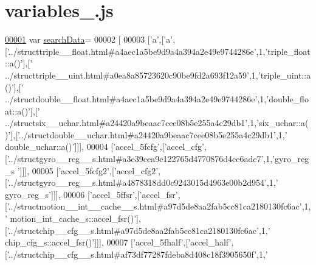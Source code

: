 \hypertarget{variables__1_8js_source}{}\section{variables\+\_.\+js}
\label{variables__1_8js_source}

\begin{DoxyCode}
\hypertarget{variables__1_8js_source.tex_l00001}{}\hyperlink{variables__1_8js_ad01a7523f103d6242ef9b0451861231e}{00001} var \hyperlink{variables__1_8js_ad01a7523f103d6242ef9b0451861231e}{searchData}=
00002 [
00003   [\textcolor{charliteral}{'a'},[\textcolor{charliteral}{'a'},[\textcolor{stringliteral}{'../structtriple\_\_float.html#a4aec1a5be9d9a4a394a2e49e9744286e'},1,\textcolor{stringliteral}{'triple\_float::a()'}],[\textcolor{stringliteral}{'
      ../structtriple\_\_uint.html#a0ea8a85723620c90be9fd2a693f12a59'},1,\textcolor{stringliteral}{'triple\_uint::a()'}],[\textcolor{stringliteral}{'
      ../structdouble\_\_float.html#a4aec1a5be9d9a4a394a2e49e9744286e'},1,\textcolor{stringliteral}{'double\_float::a()'}],[\textcolor{stringliteral}{'
      ../structsix\_\_uchar.html#a24420a9beaac7cee08b5e255a4c29db1'},1,\textcolor{stringliteral}{'six\_uchar::a()'}],[\textcolor{stringliteral}{'../structdouble\_\_uchar.html#a24420a9beaac7cee08b5e255a4c29db1'},1,\textcolor{stringliteral}{'
      double\_uchar::a()'}]]],
00004   [\textcolor{stringliteral}{'accel\_5fcfg'},[\textcolor{stringliteral}{'accel\_cfg'},[\textcolor{stringliteral}{'../structgyro\_\_reg\_\_s.html#a3e39cea9e122765d4770876d4ce6adc7'},1,\textcolor{stringliteral}{'gyro\_reg\_s
      '}]]],
00005   [\textcolor{stringliteral}{'accel\_5fcfg2'},[\textcolor{stringliteral}{'accel\_cfg2'},[\textcolor{stringliteral}{'../structgyro\_\_reg\_\_s.html#a4878318dd0c9243015d4963e00b2d954'},1,\textcolor{stringliteral}{'
      gyro\_reg\_s'}]]],
00006   [\textcolor{stringliteral}{'accel\_5ffsr'},[\textcolor{stringliteral}{'accel\_fsr'},[\textcolor{stringliteral}{'../structmotion\_\_int\_\_cache\_\_s.html#a97d5de8aa2fab5cc81ca2180130fc6ac'},1,\textcolor{stringliteral}{'
      motion\_int\_cache\_s::accel\_fsr()'}],[\textcolor{stringliteral}{'../structchip\_\_cfg\_\_s.html#a97d5de8aa2fab5cc81ca2180130fc6ac'},1,\textcolor{stringliteral}{'
      chip\_cfg\_s::accel\_fsr()'}]]],
00007   [\textcolor{stringliteral}{'accel\_5fhalf'},[\textcolor{stringliteral}{'accel\_half'},[\textcolor{stringliteral}{'../structchip\_\_cfg\_\_s.html#af73df77287fdeba8d408c18f3905650f'},1,\textcolor{stringliteral}{'
}
\end{DoxyCode}

